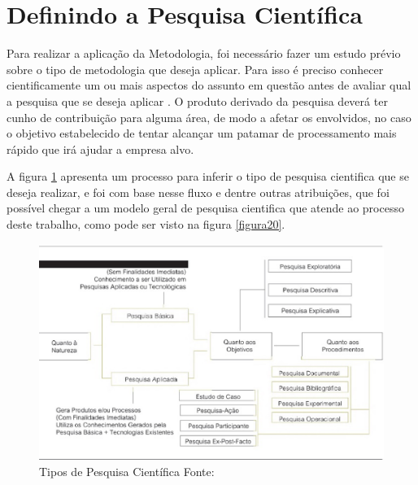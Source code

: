     \section{Definindo a Pesquisa Científica}

        Para realizar a aplicação da Metodologia, foi necessário fazer um estudo prévio sobre o tipo de metodologia que deseja
        aplicar. Para isso é preciso conhecer cientificamente um ou mais aspectos do assunto em questão antes de avaliar qual a
        pesquisa que se deseja aplicar \cite{prodanov2013}. O produto derivado da pesquisa deverá ter cunho de contribuição para alguma área, de
        modo a afetar os envolvidos, no caso o objetivo estabelecido de tentar alcançar um patamar de processamento mais
        rápido que irá ajudar a empresa alvo.

        A figura \ref{figura19} apresenta um processo para inferir o tipo de pesquisa cientifica que se deseja realizar, e foi com
        base nesse fluxo e dentre outras atribuições, que foi possível chegar a um modelo geral de pesquisa cientifica que atende
        ao processo deste trabalho, como pode ser visto na figura \ref{figura20}.

        \begin{figure}[ht!]
        \centering
            \includegraphics[keepaspectratio=true,scale=0.65]
                                      {figuras/figura19.eps}
                \caption[Tipos de Pesquisa Científica]{Tipos de Pesquisa Científica
                \protect\linebreak Fonte: }
                \label{figura19}
        \end{figure}


